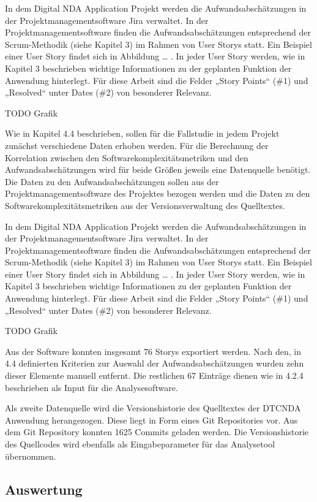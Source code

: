 In dem Digital NDA Application Projekt werden die Aufwandsabschätzungen
in der Projektmanagementsoftware Jira verwaltet. In der
Projektmanagementsoftware finden die Aufwandsabschätzungen entsprechend
der Scrum-Methodik (siehe Kapitel 3) im Rahmen von User Storys statt.
Ein Beispiel einer User Story findet sich in Abbildung \ldots{} . In
jeder User Story werden, wie in Kapitel 3 beschrieben wichtige
Informationen zu der geplanten Funktion der Anwendung hinterlegt. Für
diese Arbeit sind die Felder „Story Points`` (\#1) und „Resolved`` unter
Dates (\#2) von besonderer Relevanz.

TODO Grafik

Wie in Kapitel 4.4 beschrieben, sollen für die Fallstudie in jedem
Projekt zunächst verschiedene Daten erhoben werden. Für die Berechnung
der Korrelation zwischen den Softwarekomplexitätsmetriken und den
Aufwandsabschätzungen wird für beide Größen jeweils eine Datenquelle
benötigt. Die Daten zu den Aufwandsabschätzungen sollen aus der
Projektmanagementsoftware des Projektes bezogen werden und die Daten zu
den Softwarekomplexitätsmetriken aus der Versionsverwaltung des
Quelltextes.

In dem Digital NDA Application Projekt werden die Aufwandsabschätzungen
in der Projektmanagementsoftware Jira verwaltet. In der
Projektmanagementsoftware finden die Aufwandsabschätzungen entsprechend
der Scrum-Methodik (siehe Kapitel 3) im Rahmen von User Storys statt.
Ein Beispiel einer User Story findet sich in Abbildung \ldots{} . In
jeder User Story werden, wie in Kapitel 3 beschrieben wichtige
Informationen zu der geplanten Funktion der Anwendung hinterlegt. Für
diese Arbeit sind die Felder „Story Points`` (\#1) und „Resolved`` unter
Dates (\#2) von besonderer Relevanz.

TODO Grafik

Aus der Software konnten insgesamt 76 Storys exportiert werden. Nach
den, in 4.4 definierten Kriterien zur Auswahl der Aufwandsabschätzungen
wurden zehn dieser Elemente manuell entfernt. Die restlichen 67 Einträge
dienen wie in 4.2.4 beschrieben als Input für die Analysesoftware.

Als zweite Datenquelle wird die Versionshistorie des Quelltextes der
DTCNDA Anwendung herangezogen. Diese liegt in Form eines Git
Repositories vor. Aus dem Git Repository konnten 1625 Commits geladen
werden. Die Versionshistorie des Quellcodes wird ebenfalls als
Eingabeparameter für das Analysetool übernommen.

\subsection{Auswertung}\label{Auswertung}

